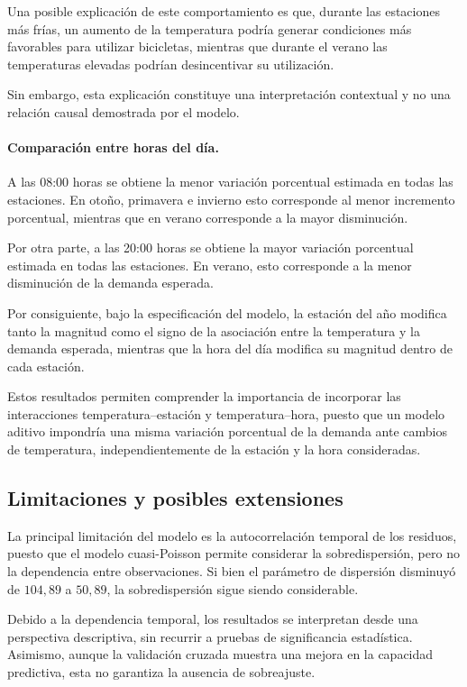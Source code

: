 \documentclass[12pt, a4paper]{article}
\numberwithin{equation}{section}
\begin{document}
Una posible explicación de este comportamiento es que,
durante las estaciones más frías, un aumento de la
temperatura podría generar condiciones más favorables
para utilizar bicicletas, mientras que durante el
verano las temperaturas elevadas podrían desincentivar
su utilización.

Sin embargo, esta explicación constituye una
interpretación contextual y no una relación causal
demostrada por el modelo.

\paragraph{Comparación entre horas del día.}

A las 08:00 horas se obtiene la menor variación
porcentual estimada en todas las estaciones.
En otoño, primavera e invierno esto corresponde
al menor incremento porcentual, mientras que
en verano corresponde a la mayor disminución.

Por otra parte, a las 20:00 horas se obtiene
la mayor variación porcentual estimada en todas
las estaciones. En verano, esto corresponde a
la menor disminución de la demanda esperada.

Por consiguiente, bajo la especificación del modelo,
la estación del año modifica tanto la magnitud como
el signo de la asociación entre la temperatura y
la demanda esperada, mientras que la hora del día
modifica su magnitud dentro de cada estación.

Estos resultados permiten comprender la importancia
de incorporar las interacciones temperatura--estación
y temperatura--hora, puesto que un modelo aditivo
impondría una misma variación porcentual de la
demanda ante cambios de temperatura, independientemente
de la estación y la hora consideradas.

\subsection{Limitaciones y posibles extensiones}

La principal limitación del modelo es la autocorrelación
temporal de los residuos, puesto que el modelo cuasi-Poisson
permite considerar la sobredispersión, pero no la dependencia
entre observaciones. Si bien el parámetro de dispersión
disminuyó de $104{,}89$ a $50{,}89$, la sobredispersión sigue
siendo considerable.

Debido a la dependencia temporal, los resultados se
interpretan desde una perspectiva descriptiva, sin recurrir
a pruebas de significancia estadística. Asimismo, aunque
la validación cruzada muestra una mejora en la capacidad
predictiva, esta no garantiza la ausencia de sobreajuste.
\end{document}
